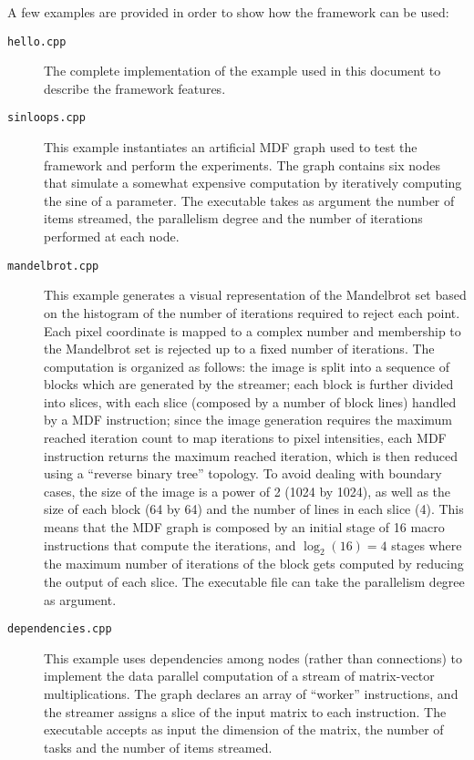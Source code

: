 \documentclass[a4paper, 11pt, oneside]{article}
\begin{document}
A few examples are provided in order to show how the framework can be used:
\begin{description}
\item[\texttt{hello.cpp}] The complete implementation of the example used in this document to describe the framework features.
\item[\texttt{sinloops.cpp}] This example instantiates an artificial MDF graph used to test the framework and perform the experiments. The graph contains six nodes that simulate a somewhat expensive computation by iteratively computing the sine of a parameter. The executable takes as argument the number of items streamed, the parallelism degree and the number of iterations performed at each node.
\item[\texttt{mandelbrot.cpp}] This example generates a visual representation of the Mandelbrot set based on the histogram of the number of iterations required to reject each point.
Each pixel coordinate is mapped to a complex number and membership to the Mandelbrot set is rejected up to a fixed number of iterations. The computation is organized as follows: the image is split into a sequence of blocks which are generated by the streamer; each block is further divided into slices, with each slice (composed by a number of block lines) handled by a MDF instruction; since the image generation requires the maximum reached iteration count to map iterations to pixel intensities, each MDF instruction returns the maximum reached iteration, which is then reduced using a ``reverse binary tree'' topology. To avoid dealing with boundary cases, the size of the image is a power of 2 (1024 by 1024), as well as the size of each block (64 by 64) and the number of lines in each slice (4). This means that the MDF graph is composed by an initial stage of 16 macro instructions that compute the iterations, and $\log_2(16)=4$ stages where the maximum number of iterations of the block gets computed by reducing the output of each slice.  The executable file can take the parallelism degree as argument.
\item[\texttt{dependencies.cpp}] This example uses dependencies among nodes (rather than connections) to implement the data parallel computation of a stream of matrix-vector multiplications. The graph declares an array of ``worker'' instructions, and the streamer assigns a slice of the input matrix to each instruction. The executable accepts as input the dimension of the matrix, the number of tasks and the number of items streamed.
\end{description}
\end{document}
